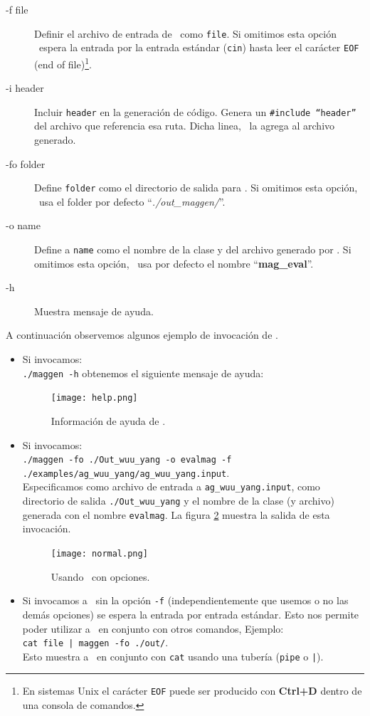 \begin{description}
\item [-f  file] Definir el archivo de entrada de \maggen\ como \texttt{file}. Si omitimos esta opción \maggen\ espera la entrada por la entrada estándar (\texttt{cin}) hasta leer el carácter \texttt{EOF} (end of file)\footnote{En sistemas Unix el carácter \texttt{EOF} puede ser producido con \textbf{Ctrl+D} dentro de una consola de comandos.}.
\item [-i  header] Incluir \texttt{header} en la generación de código. Genera un \texttt{\#include ``header''} del archivo que referencia esa ruta. Dicha linea, \maggen\ la agrega al archivo generado.
\item [-fo folder] Define \texttt{folder} como el directorio de salida para \maggen. Si omitimos esta opción, \maggen\ usa el folder por defecto ``\textit{./out\_maggen/}''.
\item [-o  name] Define a \texttt{name} como el nombre de la clase y del archivo generado por \maggen. Si omitimos esta opción, \maggen\ usa por defecto el nombre ``\textbf{mag\_eval}''.
\item [-h] Muestra mensaje de ayuda.
\end{description}

A continuación observemos algunos ejemplo de invocación de \maggen.
\begin{itemize}
\item Si invocamos:\\ \texttt{./maggen -h} obtenemos el siguiente mensaje de ayuda:

\begin{figure}[h!]\centering
\texttt{[image: help.png]}
\caption{\label{fig:outhelp} Información de ayuda de \maggen.}
\end{figure}

\item Si invocamos: \\ \texttt{./maggen -fo ./Out\_wuu\_yang -o evalmag -f ./examples/ag\_wuu\_yang/ag\_wuu\_yang.input}. \\ Especificamos como archivo de entrada a \texttt{ag\_wuu\_yang.input}, como directorio de salida \texttt{./Out\_wuu\_yang} y el nombre de la clase (y archivo) generada con el nombre \texttt{evalmag}. La figura \ref{fig:outnormal} muestra la salida de esta invocación.

\begin{figure}[h!]\centering
\texttt{[image: normal.png]}
\caption{\label{fig:outnormal} Usando \maggen\ con opciones.}
\end{figure}

\item Si invocamos a \maggen\ sin la opción \texttt{-f} (independientemente que usemos o no las demás opciones) se espera la entrada por entrada estándar. Esto nos permite poder utilizar a \maggen\ en conjunto con otros comandos, Ejemplo:\\ \texttt{cat file | maggen -fo ./out/}.\\ Esto muestra a \maggen\ en conjunto con \texttt{cat} usando una tubería (\texttt{pipe} o \texttt{|}).

\end{itemize}

